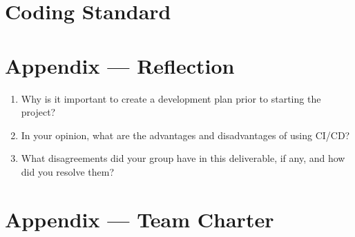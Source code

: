 \documentclass{article}
\begin{document}



\section{Coding Standard}


\newpage{}

\section*{Appendix --- Reflection}




\begin{enumerate}
    \item Why is it important to create a development plan prior to starting the
    project?
    \item In your opinion, what are the advantages and disadvantages of using
    CI/CD?
    \item What disagreements did your group have in this deliverable, if any,
    and how did you resolve them?
\end{enumerate}

\newpage{}

\section*{Appendix --- Team Charter}
\end{document}

